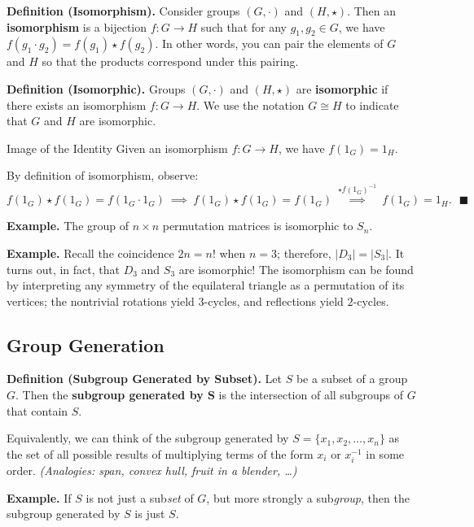 \textbf{Definition (Isomorphism).} Consider groups $(G, \cdot)$ and $(H, \star)$.  Then an \textbf{isomorphism} is a bijection $f: G \to H$ such that for any $g_1, g_2 \in G$, we have $f(g_1 \cdot g_2) = f(g_1) \star f(g_2)$.  In other words, you can pair the elements of $G$ and $H$ so that the products correspond under this pairing.

\textbf{Definition (Isomorphic).} Groups $(G, \cdot)$ and $(H, \star)$ are \textbf{isomorphic} if there exists an isomorphism $f: G \to H$.  We use the notation $G \cong H$ to indicate that $G$ and $H$ are isomorphic.

\begin{theorem}{Image of the Identity}
    Given an isomorphism $f: G \to H$, we have $f(1_G) = 1_H$.
\end{theorem}

\begin{proof*}
    By definition of isomorphism, observe:
    \[ f(1_G) \star f(1_G) = f(1_G \cdot 1_G) ~ \implies ~ f(1_G) \star f(1_G) = f(1_G) ~ \stackrel{\star f(1_G)^{-1}}{\implies} ~ f(1_G) = 1_H. ~~~ \blacksquare\]
\end{proof*}

\textbf{Example.} The group of $n \times n$ permutation matrices is isomorphic to $S_n$.

\textbf{Example.} Recall the coincidence $2n = n!$ when $n = 3$; therefore, $|D_3| = |S_3|$.  It turns out, in fact, that $D_3$ and $S_3$ are isomorphic!  The isomorphism can be found by interpreting any symmetry of the equilateral triangle as a permutation of its vertices; the nontrivial rotations yield $3$-cycles, and reflections yield $2$-cycles.

\subsection{Group Generation}

\textbf{Definition (Subgroup Generated by Subset).} Let $S$ be a subset of a group $G$.  Then the \textbf{subgroup generated by $\mathbf{S}$} is the intersection of all subgroups of $G$ that contain $S$.

Equivalently, we can think of the subgroup generated by $S = \{x_1, x_2, \dots, x_n\}$ as the set of all possible results of multiplying terms of the form $x_i$ or $x_i^{-1}$ in some order.  \emph{(Analogies: span, convex hull, fruit in a blender, \dots)}

\textbf{Example.} If $S$ is not just a sub\emph{set} of $G$, but more strongly a sub\emph{group}, then the subgroup generated by $S$ is just $S$.

